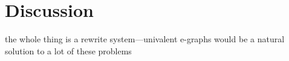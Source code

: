\section{Discussion}

the whole thing is a rewrite system---univalent e-graphs would be a natural solution to a lot of these problems
